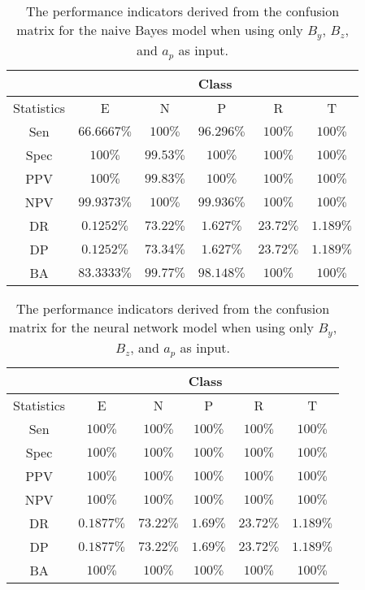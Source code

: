 \begin{table}[!ht]
	\centering
	\begin{tabular}{|c|c|c|c|c|c|}
		\hline
		 & \multicolumn{5}{c|}{Class} \\ \hline
		Statistics & E & N & P & R & T \\ \hline
		Sen & $66.6667\%$ & $100\%$ & $96.296\%$ & $100\%$ & $100\%$ \\ \hline
		Spec & $100\%$ & $99.53\%$ & $100\%$ & $100\%$ & $100\%$ \\ \hline
		PPV & $100\%$ & $99.83\%$ & $100\%$ & $100\%$ & $100\%$ \\ \hline
		NPV & $99.9373\%$ & $100\%$ & $99.936\%$ & $100\%$ & $100\%$ \\ \hline
		DR & $0.1252\%$ & $73.22\%$ & $1.627\%$ & $23.72\%$ & $1.189\%$ \\ \hline
		DP & $0.1252\%$ & $73.34\%$ & $1.627\%$ & $23.72\%$ & $1.189\%$ \\ \hline
		BA & $83.3333\%$ & $99.77\%$ & $98.148\%$ & $100\%$ & $100\%$ \\ \hline
	\end{tabular}
	\caption{The performance indicators derived from the confusion matrix for the naive Bayes model when using only $B_{y}$, $B_{z}$, and $a_{p}$ as input.}
	\label{tab:cs:reverse:yzap:nb}
\end{table}

\begin{table}[!ht]
	\centering
	\begin{tabular}{|c|c|c|c|c|c|}
		\hline
		 & \multicolumn{5}{c|}{Class} \\ \hline
		Statistics & E & N & P & R & T \\ \hline
		Sen & $100\%$ & $100\%$ & $100\%$ & $100\%$ & $100\%$ \\ \hline
		Spec & $100\%$ & $100\%$ & $100\%$ & $100\%$ & $100\%$ \\ \hline
		PPV & $100\%$ & $100\%$ & $100\%$ & $100\%$ & $100\%$ \\ \hline
		NPV & $100\%$ & $100\%$ & $100\%$ & $100\%$ & $100\%$ \\ \hline
		DR & $0.1877\%$ & $73.22\%$ & $1.69\%$ & $23.72\%$ & $1.189\%$ \\ \hline
		DP & $0.1877\%$ & $73.22\%$ & $1.69\%$ & $23.72\%$ & $1.189\%$ \\ \hline
		BA & $100\%$ & $100\%$ & $100\%$ & $100\%$ & $100\%$ \\ \hline
	\end{tabular}
	\caption{The performance indicators derived from the confusion matrix for the neural network model when using only $B_{y}$, $B_{z}$, and $a_{p}$ as input.}
	\label{tab:cs:reverse:yzap:nnet}
\end{table}

